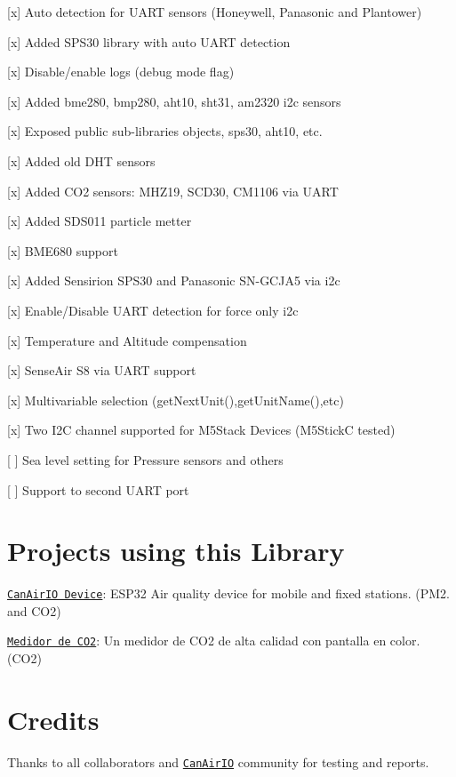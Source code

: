 \begin{DoxyItemize}
\item \mbox{[}x\mbox{]} Auto detection for U\+A\+RT sensors (Honeywell, Panasonic and Plantower)
\item \mbox{[}x\mbox{]} Added S\+P\+S30 library with auto U\+A\+RT detection
\item \mbox{[}x\mbox{]} Disable/enable logs (debug mode flag)
\item \mbox{[}x\mbox{]} Added bme280, bmp280, aht10, sht31, am2320 i2c sensors
\item \mbox{[}x\mbox{]} Exposed public sub-\/libraries objects, sps30, aht10, etc.
\item \mbox{[}x\mbox{]} Added old D\+HT sensors
\item \mbox{[}x\mbox{]} Added C\+O2 sensors\+: M\+H\+Z19, S\+C\+D30, C\+M1106 via U\+A\+RT
\item \mbox{[}x\mbox{]} Added S\+D\+S011 particle metter
\item \mbox{[}x\mbox{]} B\+M\+E680 support
\item \mbox{[}x\mbox{]} Added Sensirion S\+P\+S30 and Panasonic S\+N-\/\+G\+C\+J\+A5 via i2c
\item \mbox{[}x\mbox{]} Enable/\+Disable U\+A\+RT detection for force only i2c
\item \mbox{[}x\mbox{]} Temperature and Altitude compensation
\item \mbox{[}x\mbox{]} Sense\+Air S8 via U\+A\+RT support
\item \mbox{[}x\mbox{]} Multivariable selection (get\+Next\+Unit(),get\+Unit\+Name(),etc)
\item \mbox{[}x\mbox{]} Two I2C channel supported for M5\+Stack Devices (M5\+StickC tested)
\item \mbox{[} \mbox{]} Sea level setting for Pressure sensors and others
\item \mbox{[} \mbox{]} Support to second U\+A\+RT port
\end{DoxyItemize}

\section*{Projects using this Library}


\begin{DoxyItemize}
\item \href{https://github.com/kike-canaries/canairio_firmware}{\tt Can\+Air\+IO Device}\+: E\+S\+P32 Air quality device for mobile and fixed stations. (P\+M2. and C\+O2)
\item \href{https://emariete.com/medidor-co2-display-tft-color-ttgo-t-display-sensirion-scd30}{\tt Medidor de C\+O2}\+: Un medidor de C\+O2 de alta calidad con pantalla en color. (C\+O2)
\end{DoxyItemize}

\section*{Credits}

Thanks to all collaborators and \href{https://canair.io}{\tt Can\+Air\+IO} community for testing and reports. 

 